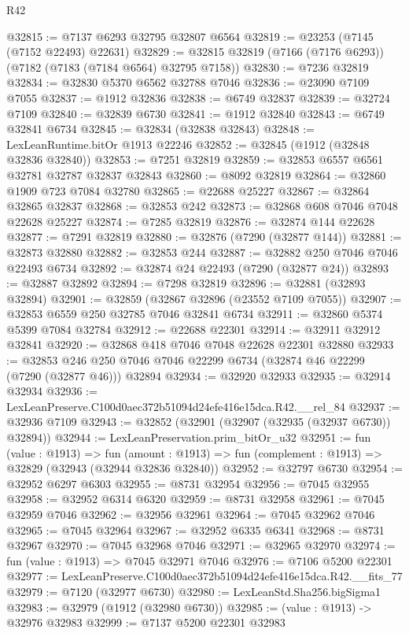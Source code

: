 \begin{lexlean}{R42}
\begin{coremodule}
{@32815 := @7137 @6293 @32795 @32807 @6564
@32819 := @23253 (@7145 (@7152 @22493) @22631)
@32829 := @32815 @32819 (@7166 (@7176 @6293)) (@7182 (@7183 (@7184 @6564) @32795 @7158))
@32830 := @7236 @32819
@32834 := @32830 @5370 @6562 @32788 @7046
@32836 := @23090 @7109 @7055
@32837 := @1912 @32836
@32838 := @6749 @32837
@32839 := @32724 @7109
@32840 := @32839 @6730
@32841 := @1912 @32840
@32843 := @6749 @32841 @6734
@32845 := @32834 (@32838 @32843)
@32848 := LexLeanRuntime.bitOr @1913 @22246
@32852 := @32845 (@1912 (@32848 @32836 @32840))
@32853 := @7251 @32819
@32859 := @32853 @6557 @6561 @32781 @32787 @32837 @32843
@32860 := @8092 @32819
@32864 := @32860 @1909 @723 @7084 @32780
@32865 := @22688 @25227
@32867 := @32864 @32865 @32837
@32868 := @32853 @242
@32873 := @32868 @608 @7046 @7048 @22628 @25227
@32874 := @7285 @32819
@32876 := @32874 @144 @22628
@32877 := @7291 @32819
@32880 := @32876 (@7290 (@32877 @144))
@32881 := @32873 @32880
@32882 := @32853 @244
@32887 := @32882 @250 @7046 @7046 @22493 @6734
@32892 := @32874 @24 @22493 (@7290 (@32877 @24))
@32893 := @32887 @32892
@32894 := @7298 @32819
@32896 := @32881 (@32893 @32894)
@32901 := @32859 (@32867 @32896 (@23552 @7109 @7055))
@32907 := @32853 @6559 @250 @32785 @7046 @32841 @6734
@32911 := @32860 @5374 @5399 @7084 @32784
@32912 := @22688 @22301
@32914 := @32911 @32912 @32841
@32920 := @32868 @418 @7046 @7048 @22628 @22301 @32880
@32933 := @32853 @246 @250 @7046 @7046 @22299 @6734 (@32874 @46 @22299 (@7290 (@32877 @46))) @32894
@32934 := @32920 @32933
@32935 := @32914 @32934
@32936 := LexLeanPreserve.C100d0aec372b51094d24efe416e15dca.R42.__rel_84
@32937 := @32936 @7109
@32943 := @32852 (@32901 (@32907 (@32935 (@32937 @6730)) @32894))
@32944 := LexLeanPreservation.prim_bitOr_u32
@32951 := fun (value : @1913) =>
  fun (amount : @1913) => fun (complement : @1913) => @32829 (@32943 (@32944 @32836 @32840))
@32952 := @32797 @6730
@32954 := @32952 @6297 @6303
@32955 := @8731 @32954
@32956 := @7045 @32955
@32958 := @32952 @6314 @6320
@32959 := @8731 @32958
@32961 := @7045 @32959 @7046
@32962 := @32956 @32961
@32964 := @7045 @32962 @7046
@32965 := @7045 @32964
@32967 := @32952 @6335 @6341
@32968 := @8731 @32967
@32970 := @7045 @32968 @7046
@32971 := @32965 @32970
@32974 := fun (value : @1913) => @7045 @32971 @7046
@32976 := @7106 @5200 @22301
@32977 := LexLeanPreserve.C100d0aec372b51094d24efe416e15dca.R42.__fits_77
@32979 := @7120 (@32977 @6730)
@32980 := LexLeanStd.Sha256.bigSigma1
@32983 := @32979 (@1912 (@32980 @6730))
@32985 := (value : @1913) -> @32976 @32983
@32999 := @7137
    @5200
    @22301
    @32983
}
\end{coremodule}
\end{lexlean}

